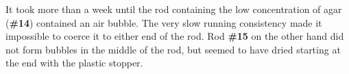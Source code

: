 It took more than a week until the rod containing the low concentration of agar (\textbf{\#14}) contained an air bubble.
The very slow running consistency made it impossible to coerce it to either end of the rod.
Rod \textbf{\#15} on the other hand did not form bubbles in the middle of the rod, but seemed to have dried starting at the end with the plastic stopper.


